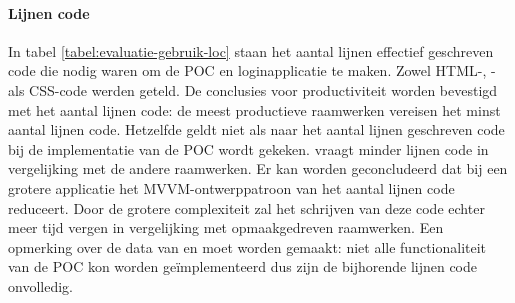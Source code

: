 \paragraph{Lijnen code} 
In tabel \ref{tabel:evaluatie-gebruik-loc} staan het aantal lijnen effectief geschreven code  die nodig waren om de POC en loginapplicatie te maken.
Zowel HTML-, \js{}- als CSS-code werden geteld.
De conclusies voor productiviteit worden bevestigd met het aantal lijnen code:  de meest productieve raamwerken vereisen het minst aantal lijnen code.
Hetzelfde geldt niet als naar het aantal lijnen geschreven code bij de implementatie van de POC wordt gekeken.
\kendo{} vraagt minder lijnen code in vergelijking met de andere raamwerken.
Er kan worden geconcludeerd dat bij een grotere applicatie het MVVM-ontwerppatroon van \kendo{} het aantal lijnen code reduceert.
Door de grotere complexiteit zal het schrijven van deze code echter meer tijd vergen in vergelijking met opmaakgedreven raamwerken.
Een opmerking over de data van \st{} en \lungo{} moet worden gemaakt:  niet alle functionaliteit van de POC kon worden geïmplementeerd dus zijn de bijhorende lijnen code onvolledig.

\begin{table}
\centering
{}
\caption{Aantal lijnen effectief geschreven code.}
\label{tabel:evaluatie-gebruik-loc}
\end{table}

